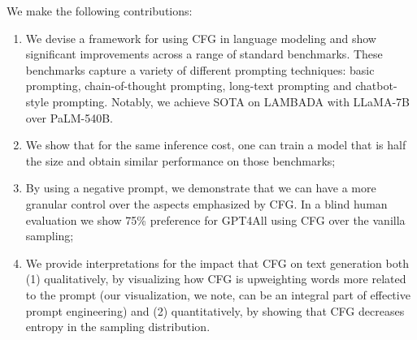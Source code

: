 \documentclass{article}
\begin{document}
We make the following contributions:

\begin{enumerate}
    \item We devise a framework for using CFG in language modeling and show significant improvements across a range of standard benchmarks. These benchmarks capture a variety of different prompting techniques: basic prompting, chain-of-thought prompting, long-text prompting and chatbot-style prompting.  Notably, we achieve SOTA on LAMBADA with LLaMA-7B over PaLM-540B.
    \item We show that for the same inference cost, one can train a model that is half the size and obtain similar performance on those benchmarks;
    \item By using a negative prompt, we demonstrate that we can have a more granular control over the aspects emphasized by CFG. In a blind human evaluation we show 75\% preference for GPT4All using CFG over the vanilla sampling;
    \item We provide interpretations for the impact that CFG on text generation both (1)  qualitatively, by visualizing how CFG is upweighting words more related to the prompt (our visualization, we note, can be an integral part of effective prompt engineering) and (2) quantitatively, by showing that CFG decreases entropy in the sampling distribution.
\end{enumerate}
\end{document}
